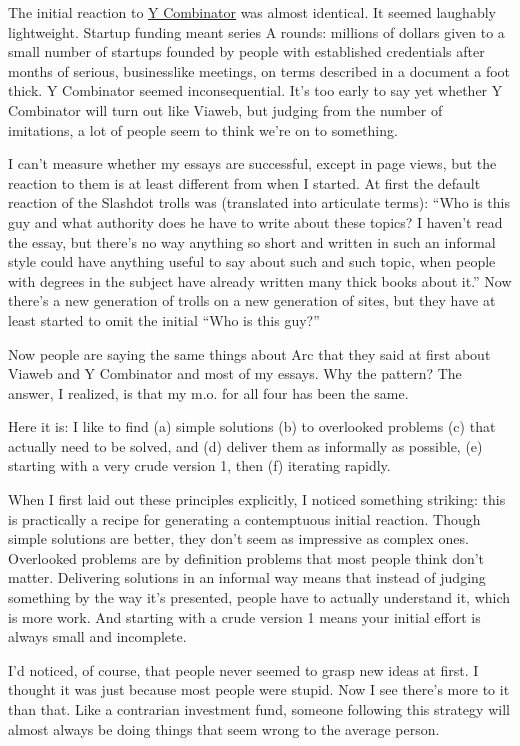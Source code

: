 \documentclass[12pt]{book}
\begin{document}
The initial reaction to \href{http://ycombinator.com}{Y Combinator} was
almost identical. It seemed laughably lightweight. Startup funding meant
series A rounds: millions of dollars given to a small number of startups
founded by people with established credentials after months of serious,
businesslike meetings, on terms described in a document a foot thick. Y
Combinator seemed inconsequential. It's too early to say yet whether Y
Combinator will turn out like Viaweb, but judging from the number of
imitations, a lot of people seem to think we're on to something.

I can't measure whether my essays are successful, except in page views,
but the reaction to them is at least different from when I started. At
first the default reaction of the Slashdot trolls was (translated into
articulate terms): ``Who is this guy and what authority does he have to
write about these topics? I haven't read the essay, but there's no way
anything so short and written in such an informal style could have
anything useful to say about such and such topic, when people with
degrees in the subject have already written many thick books about it.''
Now there's a new generation of trolls on a new generation of sites, but
they have at least started to omit the initial ``Who is this guy?''

Now people are saying the same things about Arc that they said at first
about Viaweb and Y Combinator and most of my essays. Why the pattern?
The answer, I realized, is that my m.o. for all four has been the same.

Here it is: I like to find (a) simple solutions (b) to overlooked
problems (c) that actually need to be solved, and (d) deliver them as
informally as possible, (e) starting with a very crude version 1, then
(f) iterating rapidly.

When I first laid out these principles explicitly, I noticed something
striking: this is practically a recipe for generating a contemptuous
initial reaction. Though simple solutions are better, they don't seem as
impressive as complex ones. Overlooked problems are by definition
problems that most people think don't matter. Delivering solutions in an
informal way means that instead of judging something by the way it's
presented, people have to actually understand it, which is more work.
And starting with a crude version 1 means your initial effort is always
small and incomplete.

I'd noticed, of course, that people never seemed to grasp new ideas at
first. I thought it was just because most people were stupid. Now I see
there's more to it than that. Like a contrarian investment fund, someone
following this strategy will almost always be doing things that seem
wrong to the average person.
\end{document}
